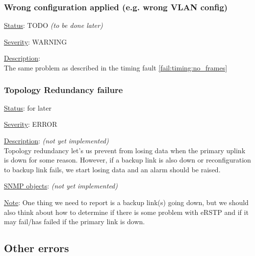 \subsubsection{\bf Wrong configuration applied (e.g. wrong VLAN config)}
		\begin{pck_descr}
			\item [] \underline{Status}: TODO \emph{(to be done later)}
			\item [] \underline{Severity}: WARNING
			\item [] \underline{Description}:\\
				The same problem as described in the timing fault
				\ref{fail:timing:no_frames}
		\end{pck_descr}

\subsubsection{\bf Topology Redundancy failure}
		\begin{pck_descr}
			\item [] \underline{Status}: for later
			\item [] \underline{Severity}: ERROR
			\item [] \underline{Description}: \emph{(not yet implemented)}\\
				Topology redundancy let's us prevent from losing data when the primary
				uplink is down for some reason. However, if a backup link is also down
				or reconfiguration to backup link fails, we start losing data and an
				alarm should be raised.
			\item [] \underline{SNMP objects}: \emph{(not yet implemented)}
			\item [] \underline{Note}: One thing we need to report is a backup link(s)
				going down, but we should also think about how to determine if there is
				some problem with eRSTP and if it may fail/has failed if the primary
				link is down.
		\end{pck_descr}

\newpage
\subsection{Other errors}
\label{sec:other_fail}

